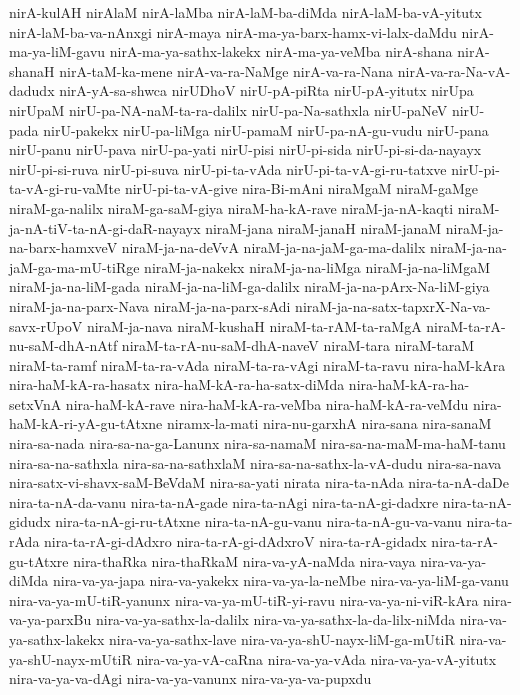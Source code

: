 {nirA-kulAH
nirAlaM
nirA-laMba
nirA-laM-ba-diMda
nirA-laM-ba-vA-yitutx
nirA-laM-ba-va-nAnxgi
nirA-maya
nirA-ma-ya-barx-hamx-vi-lalx-daMdu
nirA-ma-ya-liM-gavu
nirA-ma-ya-sathx-lakekx
nirA-ma-ya-veMba
nirA-shana
nirA-shanaH
nirA-taM-ka-mene
nirA-va-ra-NaMge
nirA-va-ra-Nana
nirA-va-ra-Na-vA-dadudx
nirA-yA-sa-shwca
nirUDhoV
nirU-pA-piRta
nirU-pA-yitutx
nirUpa
nirUpaM
nirU-pa-NA-naM-ta-ra-dalilx
nirU-pa-Na-sathxla
nirU-paNeV
nirU-pada
nirU-pakekx
nirU-pa-liMga
nirU-pamaM
nirU-pa-nA-gu-vudu
nirU-pana
nirU-panu
nirU-pava
nirU-pa-yati
nirU-pisi
nirU-pi-sida
nirU-pi-si-da-nayayx
nirU-pi-si-ruva
nirU-pi-suva
nirU-pi-ta-vAda
nirU-pi-ta-vA-gi-ru-tatxve
nirU-pi-ta-vA-gi-ru-vaMte
nirU-pi-ta-vA-give
nira-Bi-mAni
niraMgaM
niraM-gaMge
niraM-ga-nalilx
niraM-ga-saM-giya
niraM-ha-kA-rave
niraM-ja-nA-kaqti
niraM-ja-nA-tiV-ta-nA-gi-daR-nayayx
niraM-jana
niraM-janaH
niraM-janaM
niraM-ja-na-barx-hamxveV
niraM-ja-na-deVvA
niraM-ja-na-jaM-ga-ma-dalilx
niraM-ja-na-jaM-ga-ma-mU-tiRge
niraM-ja-nakekx
niraM-ja-na-liMga
niraM-ja-na-liMgaM
niraM-ja-na-liM-gada
niraM-ja-na-liM-ga-dalilx
niraM-ja-na-pArx-Na-liM-giya
niraM-ja-na-parx-Nava
niraM-ja-na-parx-sAdi
niraM-ja-na-satx-tapxrX-Na-va-savx-rUpoV
niraM-ja-nava
niraM-kushaH
niraM-ta-rAM-ta-raMgA
niraM-ta-rA-nu-saM-dhA-nAtf
niraM-ta-rA-nu-saM-dhA-naveV
niraM-tara
niraM-taraM
niraM-ta-ramf
niraM-ta-ra-vAda
niraM-ta-ra-vAgi
niraM-ta-ravu
nira-haM-kAra
nira-haM-kA-ra-hasatx
nira-haM-kA-ra-ha-satx-diMda
nira-haM-kA-ra-ha-setxVnA
nira-haM-kA-rave
nira-haM-kA-ra-veMba
nira-haM-kA-ra-veMdu
nira-haM-kA-ri-yA-gu-tAtxne
niramx-la-mati
nira-nu-garxhA
nira-sana
nira-sanaM
nira-sa-nada
nira-sa-na-ga-Lanunx
nira-sa-namaM
nira-sa-na-maM-ma-haM-tanu
nira-sa-na-sathxla
nira-sa-na-sathxlaM
nira-sa-na-sathx-la-vA-dudu
nira-sa-nava
nira-satx-vi-shavx-saM-BeVdaM
nira-sa-yati
nirata
nira-ta-nAda
nira-ta-nA-daDe
nira-ta-nA-da-vanu
nira-ta-nA-gade
nira-ta-nAgi
nira-ta-nA-gi-dadxre
nira-ta-nA-gidudx
nira-ta-nA-gi-ru-tAtxne
nira-ta-nA-gu-vanu
nira-ta-nA-gu-va-vanu
nira-ta-rAda
nira-ta-rA-gi-dAdxro
nira-ta-rA-gi-dAdxroV
nira-ta-rA-gidadx
nira-ta-rA-gu-tAtxre
nira-thaRka
nira-thaRkaM
nira-va-yA-naMda
nira-vaya
nira-va-ya-diMda
nira-va-ya-japa
nira-va-yakekx
nira-va-ya-la-neMbe
nira-va-ya-liM-ga-vanu
nira-va-ya-mU-tiR-yanunx
nira-va-ya-mU-tiR-yi-ravu
nira-va-ya-ni-viR-kAra
nira-va-ya-parxBu
nira-va-ya-sathx-la-dalilx
nira-va-ya-sathx-la-da-lilx-niMda
nira-va-ya-sathx-lakekx
nira-va-ya-sathx-lave
nira-va-ya-shU-nayx-liM-ga-mUtiR
nira-va-ya-shU-nayx-mUtiR
nira-va-ya-vA-caRna
nira-va-ya-vAda
nira-va-ya-vA-yitutx
nira-va-ya-va-dAgi
nira-va-ya-vanunx
nira-va-ya-va-pupxdu
}
